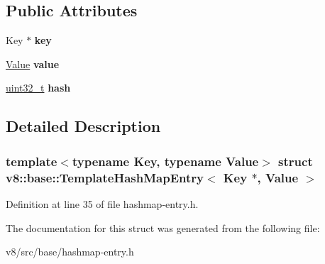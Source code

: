 \subsection*{Public Attributes}
\begin{DoxyCompactItemize}
\item 
\mbox{\label{structv8_1_1base_1_1TemplateHashMapEntry_3_01Key_01_5_00_01Value_01_4_a7a897ed3d49cda2edefcb74d4e2f1b34}} 
Key $\ast$ {\bfseries key}
\item 
\mbox{\label{structv8_1_1base_1_1TemplateHashMapEntry_3_01Key_01_5_00_01Value_01_4_a6a9d1a1607224fd7aa78b7f218434581}} 
\mbox{\hyperlink{classv8_1_1Value}{Value}} {\bfseries value}
\item 
\mbox{\label{structv8_1_1base_1_1TemplateHashMapEntry_3_01Key_01_5_00_01Value_01_4_a67a9c0d0624a47199e8f192d59375e2a}} 
\mbox{\hyperlink{classuint32__t}{uint32\+\_\+t}} {\bfseries hash}
\end{DoxyCompactItemize}


\subsection{Detailed Description}
\subsubsection*{template$<$typename Key, typename Value$>$\newline
struct v8\+::base\+::\+Template\+Hash\+Map\+Entry$<$ Key $\ast$, Value $>$}



Definition at line 35 of file hashmap-\/entry.\+h.



The documentation for this struct was generated from the following file\+:\begin{DoxyCompactItemize}
\item 
v8/src/base/hashmap-\/entry.\+h\end{DoxyCompactItemize}
